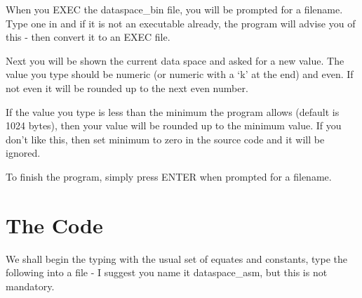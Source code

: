 When you EXEC the dataspace\_bin file, you will be prompted for a
    filename. Type one in and if it is not an executable already, the program
    will advise you of this -{} then convert it to an EXEC file.

Next you will be shown the current data space and asked for a new
    value. The value you type should be numeric (or numeric with a `k' at the
    end) and even. If not even it will be rounded up to the next even
    number.

If the value you type is less than the minimum the program allows
    (default is 1024 bytes), then your value will be rounded up to the minimum
    value. If you don't like this, then set minimum to zero in the source code
    and it will be ignored.

To finish the program, simply press ENTER when prompted for a
    filename.

\section{The Code}
\label{ch15-code}%

We shall begin the typing with the usual set of equates and
    constants, type the following into a file -{} I suggest you name it
    dataspace\_asm, but this is not mandatory.

